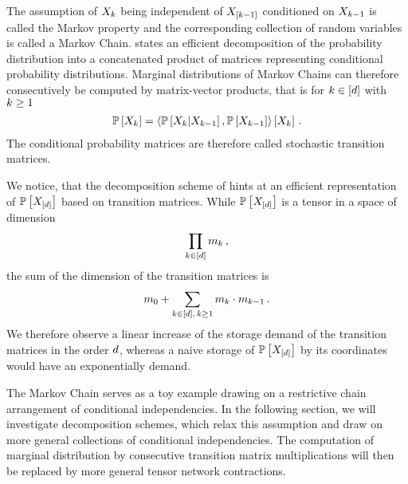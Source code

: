 The assumption of $X_{k}$ being independent of $X_{[k-1]}$ conditioned on $X_{k-1}$ is called the Markov property and the corresponding collection of random variables is called a Markov Chain.
 states an efficient decomposition of the probability distribution into a concatenated product of matrices representing conditional probability distributions.
Marginal distributions of Markov Chains can therefore consecutively be computed by matrix-vector products, that is for $k\in[d]$ with $k\geq1$
\begin{align*}
    \mathbb{P}\left[X_{k}\right]
    = \left\langle \mathbb{P}\left[X_{k}|X_{k-1}\right],\mathbb{P}\left[X_{k-1}\right]\right\rangle \left[ X_{k} \right] \, .
\end{align*}
The conditional probability matrices are therefore called stochastic transition matrices.

We notice, that the decomposition scheme of  hints at an efficient representation of $\mathbb{P}\left[X_{[d]}\right]$ based on transition matrices.
While $\mathbb{P}\left[X_{[d]}\right]$ is a tensor in a space of dimension
\begin{align*}
    \prod_{k\in[d]} m_{k} \, ,
\end{align*}
the sum of the dimension of the transition matrices is
\begin{align*}
    m_{0} + \sum_{k\in[d],\, k\geq 1} m_{k}\cdot m_{k-1} \, .
\end{align*}
We therefore observe a linear increase of the storage demand of the transition matrices in the order $d$, whereas a naive storage of $\mathbb{P}\left[X_{[d]}\right]$ by its coordinates would have an exponentially demand.

The Markov Chain serves as a toy example drawing on a restrictive chain arrangement of conditional independencies.
In the following section, we will investigate decomposition schemes, which relax this assumption and draw on more general collections of conditional independencies.
The computation of marginal distribution by consecutive transition matrix multiplications will then be replaced by more general tensor network contractions.





